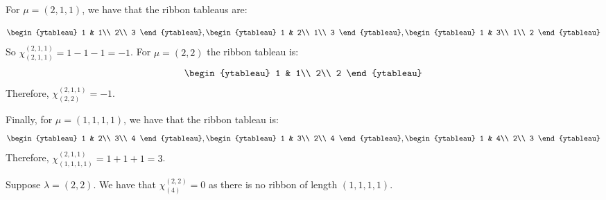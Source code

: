 \documentclass[]{article}
\begin{document}
For $\mu = (2,1,1)$, we have that the ribbon tableaus are:

\begin{equation}
	\begin{ytableau}
		1 & 1\\
		2\\
		3
	\end{ytableau}
	,
	\begin{ytableau}
		1 & 2\\
		1\\
		3
	\end{ytableau}
	,
	\begin{ytableau}
		1 & 3\\
		1\\
		2
	\end{ytableau}
\end{equation}
So $\chi^{(2,1,1)}_{(2,1,1)} = 1 - 1 -1 = -1$. 
For $\mu = (2,2)$ the ribbon tableau is:
\begin{equation}
	\begin{ytableau}
		1 & 1\\
		2\\
		2
	\end{ytableau}
\end{equation}
Therefore, $\chi^{(2,1,1)}_{(2,2)} = -1$.

Finally, for $\mu = (1,1,1,1)$, we have that the ribbon tableau is:
\begin{equation}
	\begin{ytableau}
		1 & 2\\
		3\\
		4
	\end{ytableau}
	,
	\begin{ytableau}
	1 & 3\\
	2\\
	4
\end{ytableau}
,
	\begin{ytableau}
	1 & 4\\
	2\\
	3
\end{ytableau}
\end{equation}
Therefore, $\chi^{(2,1,1)}_{(1,1,1,1)} = 1 + 1 + 1 = 3$.


Suppose $\lambda = (2,2)$. We have that $\chi^{(2,2)}_{(4)} = 0$ as there is no ribbon of length $(1,1,1,1)$. 
\end{document}
